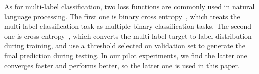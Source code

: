 As for multi-label classification, two loss functions are commonly used in natural language processing. 
The first one is binary cross entropy~\cite{nam2014large}, which treats the multi-label classification task as multiple binary classification tasks. 
The second one is cross entropy~\cite{kurata2016improved}, which converts the multi-label target to label distribution during training, and use a threshold selected on validation set to generate the final prediction during testing. In our pilot experiments, we find the latter one converges faster and performs better, so the latter one is used in this paper.